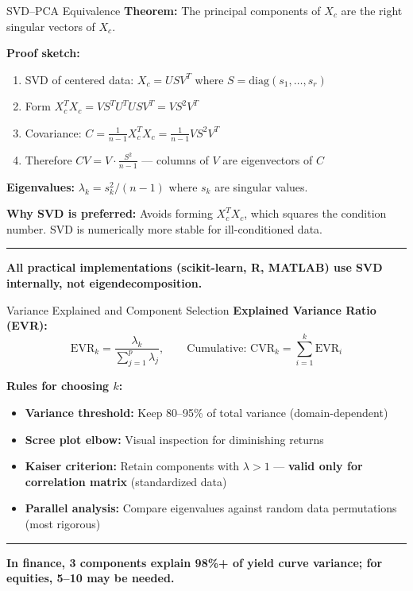 \documentclass[8pt,aspectratio=169]{beamer}
\newcommand{\bottomnote}[1]{%
\vfill
\vspace{-2mm}
\textcolor{mllavender2}{\rule{\textwidth}{0.4pt}}
\vspace{1mm}
\footnotesize
\textbf{#1}
}
\newcommand{\highlight}[1]{\textcolor{mlorange}{\textbf{#1}}}
\begin{document}
\begin{frame}[t]{SVD--PCA Equivalence}
\textbf{Theorem:} The principal components of $X_c$ are the right singular vectors of $X_c$.

\textbf{Proof sketch:}
\begin{enumerate}
  \item SVD of centered data: $X_c = U S V^T$ where $S = \text{diag}(s_1, \ldots, s_r)$
  \item Form $X_c^T X_c = V S^T U^T U S V^T = V S^2 V^T$
  \item Covariance: $C = \frac{1}{n-1} X_c^T X_c = \frac{1}{n-1} V S^2 V^T$
  \item Therefore $C V = V \cdot \frac{S^2}{n-1}$ --- columns of $V$ are eigenvectors of $C$
\end{enumerate}

\vspace{0.3em}
\textbf{Eigenvalues:} $\lambda_k = s_k^2 / (n-1)$ where $s_k$ are singular values.

\vspace{0.3em}
\textbf{Why SVD is preferred:} Avoids forming $X_c^T X_c$, which squares the condition number. SVD is numerically more stable for ill-conditioned data.
\bottomnote{All practical implementations (scikit-learn, R, MATLAB) use SVD internally, not eigendecomposition.}
\end{frame}

\begin{frame}[t]{Variance Explained and Component Selection}
\textbf{Explained Variance Ratio (EVR):}
\[
\text{EVR}_k = \frac{\lambda_k}{\sum_{j=1}^{p} \lambda_j}, \qquad \text{Cumulative: } \text{CVR}_k = \sum_{i=1}^{k} \text{EVR}_i
\]

\textbf{Rules for choosing $k$:}
\begin{itemize}
  \item \textbf{Variance threshold:} Keep 80--95\% of total variance (domain-dependent)
  \item \textbf{Scree plot elbow:} Visual inspection for diminishing returns
  \item \textbf{Kaiser criterion:} Retain components with $\lambda > 1$ --- \highlight{valid only for correlation matrix} (standardized data)
  \item \textbf{Parallel analysis:} Compare eigenvalues against random data permutations (most rigorous)
\end{itemize}
\bottomnote{In finance, 3 components explain 98\%+ of yield curve variance; for equities, 5--10 may be needed.}
\end{frame}
\end{document}
